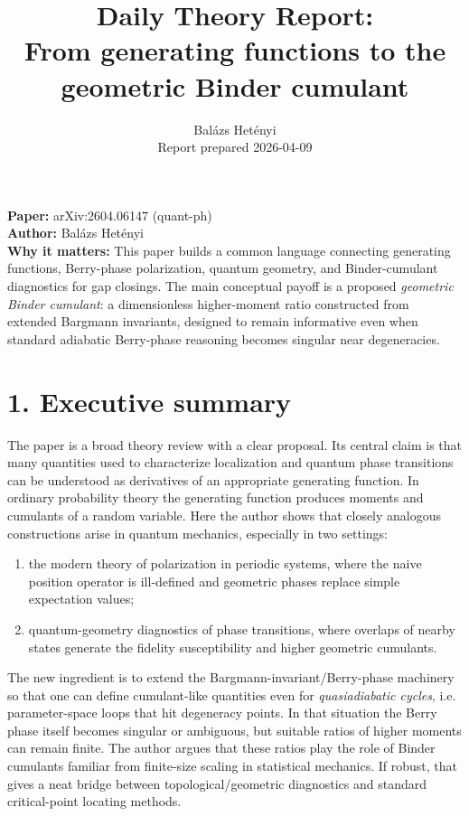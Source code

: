 \documentclass[11pt]{article}
\title{\vspace{-1.5em}\textbf{Daily Theory Report:}\\From generating functions to the geometric Binder cumulant}
\author{Bal\'azs Het\'enyi\\\normalsize Report prepared 2026-04-09}
\date{}
\begin{document}
\maketitle
\vspace{-2em}

\textbf{Paper:} arXiv:2604.06147 (quant-ph)\\
\textbf{Author:} Bal\'azs Het\'enyi\\
\textbf{Why it matters:} This paper builds a common language connecting generating functions, Berry-phase polarization, quantum geometry, and Binder-cumulant diagnostics for gap closings. The main conceptual payoff is a proposed \emph{geometric Binder cumulant}: a dimensionless higher-moment ratio constructed from extended Bargmann invariants, designed to remain informative even when standard adiabatic Berry-phase reasoning becomes singular near degeneracies.

\section*{1. Executive summary}
The paper is a broad theory review with a clear proposal. Its central claim is that many quantities used to characterize localization and quantum phase transitions can be understood as derivatives of an appropriate generating function. In ordinary probability theory the generating function produces moments and cumulants of a random variable. Here the author shows that closely analogous constructions arise in quantum mechanics, especially in two settings:
\begin{enumerate}[leftmargin=1.4em]
    \item the modern theory of polarization in periodic systems, where the naive position operator is ill-defined and geometric phases replace simple expectation values;
    \item quantum-geometry diagnostics of phase transitions, where overlaps of nearby states generate the fidelity susceptibility and higher geometric cumulants.
\end{enumerate}

The new ingredient is to extend the Bargmann-invariant/Berry-phase machinery so that one can define cumulant-like quantities even for \emph{quasiadiabatic cycles}, i.e. parameter-space loops that hit degeneracy points. In that situation the Berry phase itself becomes singular or ambiguous, but suitable ratios of higher moments can remain finite. The author argues that these ratios play the role of Binder cumulants familiar from finite-size scaling in statistical mechanics. If robust, that gives a neat bridge between topological/geometric diagnostics and standard critical-point locating methods.
\end{document}
